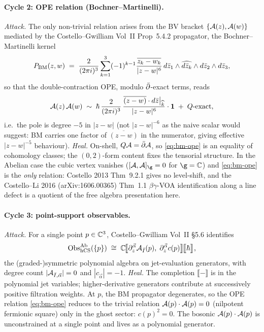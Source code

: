 \paragraph{Cycle 2: OPE relation (Bochner--Martinelli).}
\emph{Attack.} The only non-trivial relation arises from the BV bracket
$\{\mathcal{A}(z), \mathcal{A}(w)\}$ mediated by the Costello--Gwilliam Vol~II Prop~5.4.2
propagator, the Bochner--Martinelli kernel
\[
  P_{\mathrm{BM}}(z, w) \;=\;
  \frac{2}{(2\pi i)^3}
  \sum_{k=1}^{3}(-1)^{k-1}
  \frac{\overline{z_k - w_k}}{\lvert z - w \rvert^6}\,
  d\bar{z}_1 \wedge \widehat{d\bar{z}_k} \wedge d\bar{z}_2 \wedge d\bar{z}_3,
\]
so that the double-contraction OPE, modulo $\bar{\partial}$-exact terms, reads
\begin{equation}
\label{eq:bm-ope}
  \mathcal{A}(z)\,\mathcal{A}(w)
  \;\sim\;
  \hbar\,\frac{2}{(2\pi i)^3}\,
  \frac{\overline{(z - w)}\cdot d\bar{z}\big|_{\widehat{k}}}
       {\lvert z - w \rvert^6}
  \cdot \mathbf{1}
  \;+\; Q\text{-exact},
\end{equation}
i.e.\ the pole is degree $-5$ in $|z - w|$ (not $|z-w|^{-6}$ as the naive
scalar would suggest: BM carries one factor of $\overline{(z-w)}$ in the
numerator, giving effective $|z-w|^{-5}$ behaviour).
\emph{Heal.} On-shell, $Q\mathcal{A} = \bar{\partial} \mathcal{A}$, so \eqref{eq:bm-ope} is an
equality of cohomology classes; the $(0,2)$-form content fixes the
tensorial structure. In the Abelian case the cubic vertex vanishes
($[\cA, \cA]_{\g} = 0$ for $\g = \C$) and \eqref{eq:bm-ope} is the
\emph{only} relation: Costello 2013 Thm~9.2.1 gives no level-shift,
and the Costello--Li 2016 (arXiv:1606.00365) Thm~1.1 $\beta\gamma$-VOA
identification along a line defect is a quotient of the free algebra
presentation here.

\paragraph{Cycle 3: point-support observables.}
\emph{Attack.} For a single point $p \in \mathbb{C}^3$,
Costello--Gwilliam Vol~II \S5.6 identifies
\[
  \mathrm{Obs}_{\mathrm{hCS}}^{\mathrm{Ab}}(\{p\})
  \;\cong\;
  \mathbb{C}\!\bigl\llbracket
    \partial_z^{\vec{\alpha}} \mathcal{A}_{\bar{I}}(p),\;
    \partial_z^{\vec{\alpha}} c(p)
  \bigr\rrbracket\!\bigl\llbracket \hbar \bigr\rrbracket,
\]
the (graded-)symmetric polynomial algebra on jet-evaluation generators,
with degree count $|\mathcal{A}_{\bar{I}, \vec{\alpha}}| = 0$ and $|c_{\vec{\alpha}}| = -1$.
\emph{Heal.} The completion $\llbracket - \rrbracket$ is in the polynomial
jet variables; higher-derivative generators contribute at successively
positive filtration weights. At $p$, the BM propagator degenerates, so
the OPE relation \eqref{eq:bm-ope} reduces to the trivial relation
$\mathcal{A}(p) \cdot \mathcal{A}(p) = 0$ (nilpotent fermionic square) only in the ghost
sector: $c(p)^2 = 0$. The bosonic $\mathcal{A}(p) \cdot \mathcal{A}(p)$ is unconstrained
at a single point and lives as a polynomial generator.

